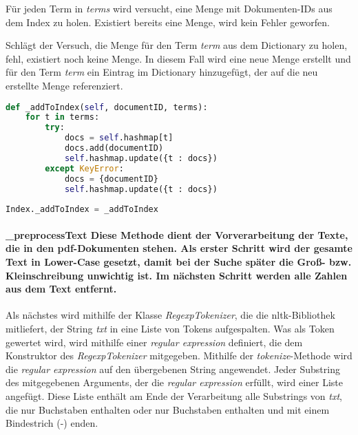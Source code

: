 Für jeden Term in \emph{terms} wird versucht, eine Menge mit
Dokumenten-IDs aus dem Index zu holen. Existiert bereits eine Menge,
wird kein Fehler geworfen.

Schlägt der Versuch, die Menge für den Term \emph{term} aus dem
Dictionary zu holen, fehl, existiert noch keine Menge. In diesem Fall
wird eine neue Menge erstellt und für den Term \emph{term} ein Eintrag
im Dictionary hinzugefügt, der auf die neu erstellte Menge referenziert.

\begin{lstlisting}[language=Python]
def _addToIndex(self, documentID, terms):
    for t in terms:
        try:
            docs = self.hashmap[t]
            docs.add(documentID)
            self.hashmap.update({t : docs})
        except KeyError:
            docs = {documentID}
            self.hashmap.update({t : docs})
    
Index._addToIndex = _addToIndex
\end{lstlisting}

\paragraph{\_preprocessText Diese Methode dient der Vorverarbeitung der
Texte, die in den pdf-Dokumenten stehen. Als erster Schritt wird der
gesamte Text in Lower-Case gesetzt, damit bei der Suche später die Groß-
bzw. Kleinschreibung unwichtig ist. Im nächsten Schritt werden alle
Zahlen aus dem Text
entfernt.}\label{preprocesstext-diese-methode-dient-der-vorverarbeitung-der-texte-die-in-den-pdf-dokumenten-stehen.-als-erster-schritt-wird-der-gesamte-text-in-lower-case-gesetzt-damit-bei-der-suche-spuxe4ter-die-grouxdf--bzw.-kleinschreibung-unwichtig-ist.-im-nuxe4chsten-schritt-werden-alle-zahlen-aus-dem-text-entfernt.}

Als nächstes wird mithilfe der Klasse \emph{RegexpTokenizer}, die die
nltk-Bibliothek mitliefert, der String \emph{txt} in eine Liste von
Tokens aufgespalten. Was als Token gewertet wird, wird mithilfe einer
\emph{regular expression} definiert, die dem Konstruktor des
\emph{RegexpTokenizer} mitgegeben. Mithilfe der \emph{tokenize}-Methode
wird die \emph{regular expression} auf den übergebenen String
angewendet. Jeder Substring des mitgegebenen Arguments, der die
\emph{regular expression} erfüllt, wird einer Liste angefügt. Diese
Liste enthält am Ende der Verarbeitung alle Substrings von \emph{txt},
die nur Buchstaben enthalten oder nur Buchstaben enthalten und mit einem
Bindestrich (-) enden.


